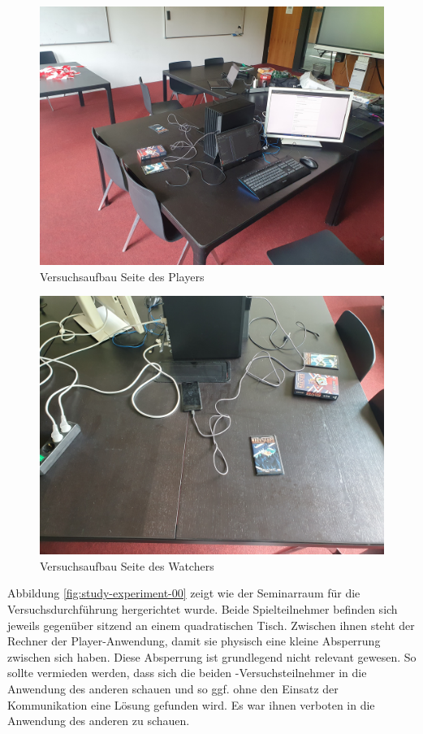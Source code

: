 \begin{figure}[ht]
\centering
\includegraphics[width=1\linewidth]{content/pictures/Aufbau_01.jpg}
\caption{Versuchsaufbau Seite des Players}
\label{fig:study-experiment-01}
\end{figure}

\begin{figure}[ht]
\centering
\includegraphics[width=1\linewidth]{content/pictures/Aufbau_02.jpg}
\caption{Versuchsaufbau Seite des Watchers}
\label{fig:study-experiment-02}
\end{figure}

Abbildung \ref{fig:study-experiment-00} zeigt wie der Seminarraum für die Versuchsdurchführung hergerichtet wurde. Beide Spielteilnehmer befinden sich jeweils gegenüber sitzend an einem quadratischen Tisch. Zwischen ihnen steht der Rechner der Player-Anwendung, damit sie physisch eine kleine Absperrung zwischen sich haben. Diese Absperrung ist grundlegend nicht relevant gewesen. So sollte vermieden werden, dass sich die beiden -Versuchsteilnehmer in die Anwendung des anderen schauen und so ggf. ohne den Einsatz der Kommunikation eine Lösung gefunden wird. Es war ihnen verboten in die Anwendung des anderen zu schauen.

